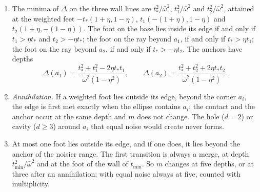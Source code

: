 \begin{theorem}\label{thm:unequal}
\begin{enumerate}[label=(\roman*)]
\item The minima of $\Delta$ on the three wall lines are $t_*^2/\bar\omega^2$, $t_1^2/\bar\omega^2$ and
$t_2^2/\bar\omega^2$, attained at the weighted feet $-t_*(1+\eta, 1-\eta)$, $t_1(-(1+\eta), 1-\eta)$ and $t_2(1+\eta, -(1-\eta))$. The foot on the base lies inside its edge if
and only if $t_1 > \eta t_*$ and $t_2 > -\eta t_*$; the foot on the ray beyond $a_1$, if and only if $t_* > \eta t_1$; the
foot on the ray beyond $a_2$, if and only if $t_* > -\eta t_2$. The anchors have depths
\[ \Delta(a_1) = \frac{t_*^2 + t_1^2 - 2\eta t_* t_1}{\bar\omega^2(1 - \eta^2)}, \qquad
   \Delta(a_2) = \frac{t_*^2 + t_2^2 + 2\eta t_* t_2}{\bar\omega^2(1 - \eta^2)}. \]
\item \emph{Annihilation.} If a weighted foot lies outside its edge, beyond the corner $a_i$, the edge is first met
exactly when the ellipse contains $a_i$: the contact and the anchor occur at the same depth and $m$ does not change. The
hole ($d = 2$) or cavity ($d \ge 3$) around $a_i$ that equal noise would create never forms.
\item At most one foot lies outside its edge, and if one does, it lies beyond the anchor of the noisier range. The first
transition is always a merge, at depth $t_{\min}^2/\bar\omega^2$ and at the foot of the wall of $t_{\min}$. So $m$ changes at
five depths, or at three after an annihilation; with equal noise always at five, counted with multiplicity.
\end{enumerate}
\end{theorem}

